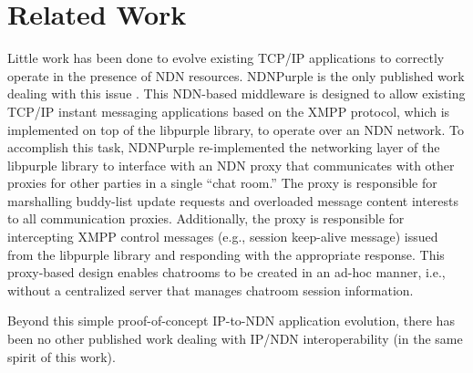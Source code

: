 \section{Related Work}
Little work has been done to evolve existing TCP/IP applications to correctly operate in the presence of NDN resources. NDNPurple is the only published work dealing with this issue \cite{wang2010implementing}. This NDN-based middleware is designed to allow existing TCP/IP instant messaging applications based on the XMPP protocol, which is implemented on top of the libpurple library, to operate over an NDN network. To accomplish this task, NDNPurple re-implemented the networking layer of the libpurple library to interface with an NDN proxy that communicates with other proxies for other parties in a single ``chat room.'' The proxy is responsible for marshalling buddy-list update requests and overloaded message content interests to all communication proxies. Additionally, the proxy is responsible for intercepting XMPP control messages (e.g., session keep-alive message) issued from the libpurple library and responding with the appropriate response. This proxy-based design enables chatrooms to be created in an ad-hoc manner, i.e., without a centralized server that manages chatroom session information. 

Beyond this simple proof-of-concept IP-to-NDN application evolution, there has been no other published work dealing with IP/NDN interoperability (in the same spirit of this work). 




